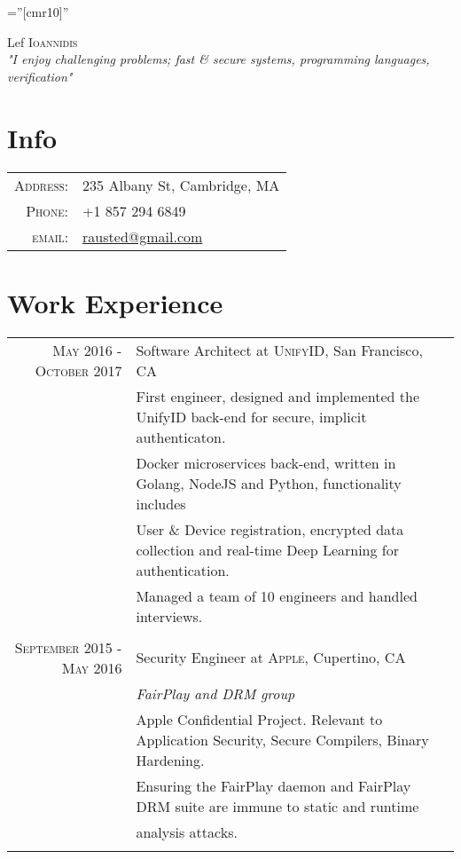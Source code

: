 \documentclass[lettersize,10pt]{article}
\begin{document}
\pagestyle{empty} %
\font\fb=''[cmr10]'' %

\par{\centering
		{\Huge Lef \textsc{Ioannidis}
	}\\[0.5cm]
	\emph{
    "I enjoy challenging problems; fast \& secure systems, programming languages, verification"}
	\bigskip\par}

\section{Info}

\begin{tabular}{rl}

    \textsc{Address:}   & 235 Albany St, Cambridge, MA \\
    \textsc{Phone:}     & +1 857 294 6849\\
    \textsc{email:}     & \href{mailto:rausted@gmail.com}{rausted@gmail.com}
\end{tabular}

\section{Work Experience}
\begin{tabular}{rl}
\textsc{ May 2016 - October 2017} & Software Architect at \textsc{UnifyID}, San Francisco, CA\\
&\footnotesize{First engineer, designed and implemented the UnifyID back-end for secure, implicit authenticaton. }\\
&\footnotesize{Docker microservices back-end, written in Golang, NodeJS and Python, functionality includes }\\
&\footnotesize{User \& Device registration, encrypted data collection and real-time Deep Learning for authentication. }\\
&\footnotesize{Managed a team of 10 engineers and handled interviews.}\\\multicolumn{2}{c}{} \\

\textsc{September 2015 - May 2016} & Security Engineer at \textsc{Apple}, Cupertino, CA \\&\emph{FairPlay and DRM group}\\
&\footnotesize{Apple Confidential Project. Relevant to Application Security, Secure Compilers, Binary Hardening.} \\
&\footnotesize{Ensuring the FairPlay daemon and FairPlay DRM suite are immune to static and runtime }\\
&\footnotesize{analysis attacks.}\\\multicolumn{2}{c}{} \\

\end{tabular}
\end{document}
